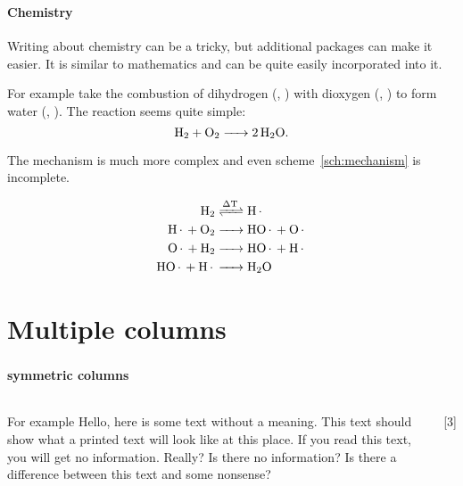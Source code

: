 \documentclass[10pt,compress,
               xcolor={dvipsnames,table},
               hyperref={breaklinks}
              ]{beamer}
\begin{document}
\begin{frame}
  \frametitle{\insertsection}
  \framesubtitle{Chemistry}
  Writing about chemistry can be a tricky, but additional packages can make it easier.
  It is similar to mathematics and can be quite easily incorporated into it.

  For example take the combustion of dihydrogen (, )
  with dioxygen (, ) to form water (, ).
  The reaction seems quite simple: \[\ce{H2 + O2 -> 2 H2O}.\]

  The mechanism is much more complex and even scheme~\ref{sch:mechanism} is incomplete.

  \begin{align*}
    \ce{H2 &<=>[\Delta T] H.}\\
    \ce{H. + O2 &-> HO. + O.}\\
    \ce{O. + H2 &-> HO. + H.}\\
    \ce{HO. + H. &-> H2O}
  \end{align*}
  \label{sch:mechanism}

\end{frame}

\section{Multiple columns}
\begin{frame}[t]
\frametitle{\insertsection}
\framesubtitle{symmetric columns}
\begin{columns}[T]
    \begin{block}{For example}
      Hello, here is some text without a
      meaning. This text should show
      what a printed text will look like at
      this place. If you read this text,
      you will get no information.
      Really? Is there no information? Is
      there a difference between this text
      and some nonsense?
    \end{block}
  \hfill
    [3]
\end{columns}
\end{frame}
\end{document}
